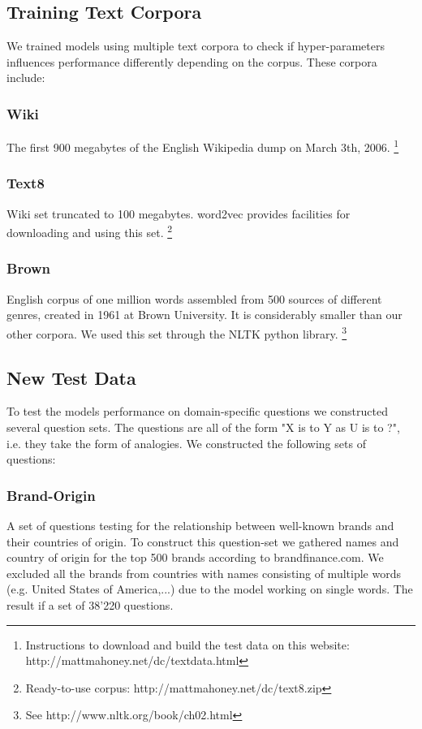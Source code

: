 \documentclass[conference]{IEEEtran}
\begin{document}
\subsection{Training Text Corpora}

We trained models using multiple text corpora to check if hyper-parameters influences performance differently depending on the corpus.
These corpora include:
\subsubsection{Wiki}
The first 900 megabytes of the English Wikipedia dump on March 3th, 2006.
\footnote{Instructions to download and build the test data on this website: http://mattmahoney.net/dc/textdata.html}

\subsubsection{Text8}
Wiki set truncated to 100 megabytes. word2vec provides facilities for downloading and using this set.
\footnote{Ready-to-use corpus: http://mattmahoney.net/dc/text8.zip}

\subsubsection{Brown}
English corpus of one million words assembled from 500 sources of different genres, created in 1961 at Brown University. It is considerably smaller than our other corpora. We used this set through the NLTK python library. \footnote{See http://www.nltk.org/book/ch02.html}

\subsection{New Test Data}
To test the models performance on domain-specific questions we constructed several 
question sets. The questions are all of the form "X is to Y as U is to ?", i.e. they take the 
form of analogies. We constructed the following sets of questions:

\subsubsection{Brand-Origin}
A set of questions testing for the relationship between well-known brands and their countries
of origin. To construct this question-set we gathered names and country of origin for 
the top 500 brands according to brandfinance.com. We excluded all the brands from countries
with names consisting of multiple words (e.g. United States of America,...) due to the model 
working on single words. The result if a set of 38'220 questions.
\end{document}
